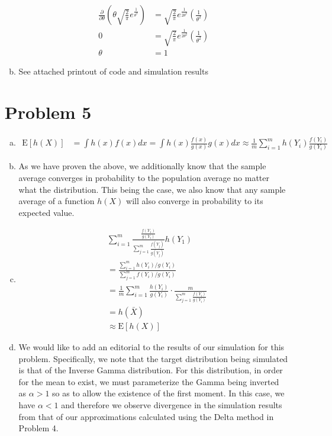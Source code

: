 \documentclass[11pt]{article}
\begin{document}
\begin{enumerate}[(a)]
\begin{enumerate}[(a)]
\begin{align*}
      \frac{\partial}{\partial \theta} \left( \theta
      \sqrt{\frac{2}{\pi}} e^{\frac{1}{\theta^2}}\right) &= \sqrt{\frac{2}{\pi}}
                                                           e^{\frac{1}{2\theta^2}}
                                                           \left(
                                                           \frac{1}{\theta^2}
                                                           \right) \\
      0 &= \sqrt{\frac{2}{\pi}} e^{\frac{1}{2\theta^2}} \left(
          \frac{1}{\theta^2} \right) \\
      \theta &= 1
    \end{align*}
\newpage
  \item See attached printout of code and simulation results
\newpage

\end{enumerate}

\section*{Problem 5}

\begin{enumerate}[(a)]
  \item 
    \begin{align*}
      \mathrm{E}[h(X)] &= \int h(x) f(x) dx = \int h(x)
      \frac{f(x)}{g(x)} g(x) dx \approx \frac{1}{m} \sum_{i=1}^m
      h(Y_i) \frac{f(Y_i)}{g(Y_i)}
    \end{align*}
  \item As we have proven the above, we additionally know that the
    sample average converges in probability to the population average
    no matter what the distribution.  This being the case, we also
    know that any sample average of a function $h(X)$ will also
    converge in probability to its expected value.
  \item 
    \begin{align*}
      &\sum_{i=1}^m \frac{\frac{f(Y_1)}{g(Y_i)}}{\sum_{j=1}^m
        \frac{f(Y_j)}{g(Y_j)}} h(Y_1) \\ 
      &= \frac{\sum_{i=1}^m
        h(Y_i)/g(Y_i)}{\sum_{j=1}^m f(Y_i)/g(Y_i)} \\
      &= \frac{1}{m} \sum_{i=1}^m \frac{h(Y_i)}{g(Y_i)} \cdot
      \frac{m}{\sum_{j=1}^m \frac{f(Y_i)}{g(Y_i)}} \\
      &= h(\bar{X}) \\
      &\approx \mathrm{E}[h(X)]
    \end{align*}
\newpage
\item We would like to add an editorial to the results of our
  simulation for this problem.  Specifically, we note that the target
  distribution being simulated is that of the Inverse Gamma
  distribution.  For this distribution, in order for the mean to
  exist, we must parameterize the Gamma being inverted as $\alpha > 1$
  so as to allow the existence of the first moment.  In this case, we
  have $\alpha < 1$ and therefore we observe divergence in the
  simulation results from that of our approximations calculated using
  the Delta method in Problem 4.


\end{enumerate}
\end{enumerate}
\end{document}
